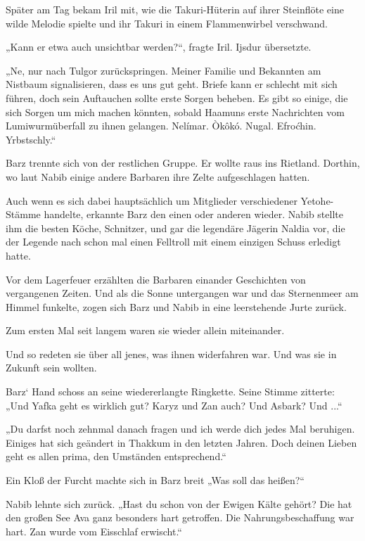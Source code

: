 Später am Tag bekam Iril mit, wie die Takuri-Hüterin auf ihrer Steinflöte eine wilde Melodie spielte und ihr Takuri in einem Flammenwirbel verschwand.

„Kann er etwa auch unsichtbar werden?“, fragte Iril. Ijsdur übersetzte.

„Ne, nur nach Tulgor zurückspringen. Meiner Familie und Bekannten am Nistbaum signalisieren, dass es uns gut geht. Briefe kann er schlecht mit sich führen, doch sein Auftauchen sollte erste Sorgen beheben. Es gibt so einige, die sich Sorgen um mich machen könnten, sobald Haamuns erste Nachrichten vom Lumiwurmüberfall zu ihnen gelangen. Nelímar. Òkôkó. Nugal. Efroćhin. Yrbstschly.“

Barz trennte sich von der restlichen Gruppe. Er wollte raus ins Rietland. Dorthin, wo laut Nabib einige andere Barbaren ihre Zelte aufgeschlagen hatten.

Auch wenn es sich dabei hauptsächlich um Mitglieder verschiedener Yetohe-Stämme handelte, erkannte Barz den einen oder anderen wieder. Nabib stellte ihm die besten Köche, Schnitzer, und gar die legendäre Jägerin Naldia vor, die der Legende nach schon mal einen Felltroll mit einem einzigen Schuss erledigt hatte.

Vor dem Lagerfeuer erzählten die Barbaren einander Geschichten von vergangenen Zeiten. Und als die Sonne untergangen war und das Sternenmeer am Himmel funkelte, zogen sich Barz und Nabib in eine leerstehende Jurte zurück.

Zum ersten Mal seit langem waren sie wieder allein miteinander.

Und so redeten sie über all jenes, was ihnen widerfahren war. Und was sie in Zukunft sein wollten.



\trennzeichen



Barz‘ Hand schoss an seine wiedererlangte Ringkette. Seine Stimme zitterte: „Und Yafka geht es wirklich gut? Karyz und Zan auch? Und Asbark? Und ...“

„Du darfst noch zehnmal danach fragen und ich werde dich jedes Mal beruhigen. Einiges hat sich geändert in Thakkum in den letzten Jahren. Doch deinen Lieben geht es allen prima, den Umständen entsprechend.“

Ein Kloß der Furcht machte sich in Barz breit „Was soll das heißen?“

Nabib lehnte sich zurück. „Hast du schon von der Ewigen Kälte gehört? Die hat den großen See Ava ganz besonders hart getroffen. Die Nahrungsbeschaffung war hart. Zan wurde vom Eisschlaf erwischt.“

